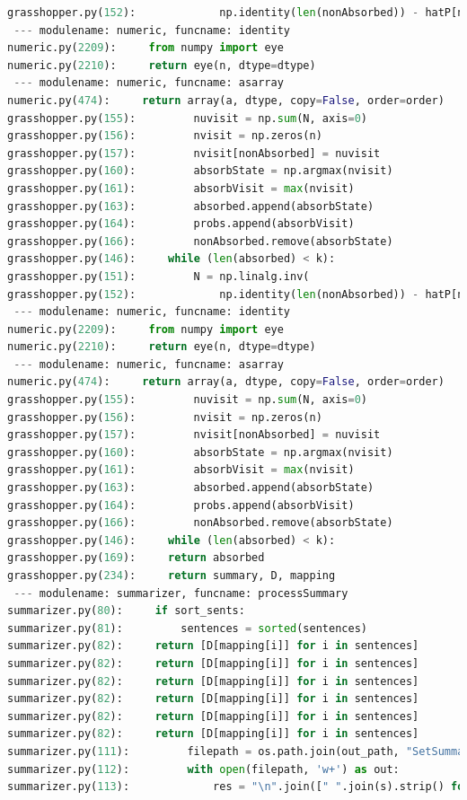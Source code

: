 \documentclass[10pt]{article}
\begin{document}
\begin{lstlisting}[breaklines,language=Python]
grasshopper.py(152):             np.identity(len(nonAbsorbed)) - hatP[nonAbsorbed, nonAbsorbed])
 --- modulename: numeric, funcname: identity
numeric.py(2209):     from numpy import eye
numeric.py(2210):     return eye(n, dtype=dtype)
 --- modulename: numeric, funcname: asarray
numeric.py(474):     return array(a, dtype, copy=False, order=order)
grasshopper.py(155):         nuvisit = np.sum(N, axis=0)
grasshopper.py(156):         nvisit = np.zeros(n)
grasshopper.py(157):         nvisit[nonAbsorbed] = nuvisit
grasshopper.py(160):         absorbState = np.argmax(nvisit)
grasshopper.py(161):         absorbVisit = max(nvisit)
grasshopper.py(163):         absorbed.append(absorbState)
grasshopper.py(164):         probs.append(absorbVisit)
grasshopper.py(166):         nonAbsorbed.remove(absorbState)
grasshopper.py(146):     while (len(absorbed) < k):
grasshopper.py(151):         N = np.linalg.inv(
grasshopper.py(152):             np.identity(len(nonAbsorbed)) - hatP[nonAbsorbed, nonAbsorbed])
 --- modulename: numeric, funcname: identity
numeric.py(2209):     from numpy import eye
numeric.py(2210):     return eye(n, dtype=dtype)
 --- modulename: numeric, funcname: asarray
numeric.py(474):     return array(a, dtype, copy=False, order=order)
grasshopper.py(155):         nuvisit = np.sum(N, axis=0)
grasshopper.py(156):         nvisit = np.zeros(n)
grasshopper.py(157):         nvisit[nonAbsorbed] = nuvisit
grasshopper.py(160):         absorbState = np.argmax(nvisit)
grasshopper.py(161):         absorbVisit = max(nvisit)
grasshopper.py(163):         absorbed.append(absorbState)
grasshopper.py(164):         probs.append(absorbVisit)
grasshopper.py(166):         nonAbsorbed.remove(absorbState)
grasshopper.py(146):     while (len(absorbed) < k):
grasshopper.py(169):     return absorbed
grasshopper.py(234):     return summary, D, mapping
 --- modulename: summarizer, funcname: processSummary
summarizer.py(80):     if sort_sents:
summarizer.py(81):         sentences = sorted(sentences)
summarizer.py(82):     return [D[mapping[i]] for i in sentences]
summarizer.py(82):     return [D[mapping[i]] for i in sentences]
summarizer.py(82):     return [D[mapping[i]] for i in sentences]
summarizer.py(82):     return [D[mapping[i]] for i in sentences]
summarizer.py(82):     return [D[mapping[i]] for i in sentences]
summarizer.py(82):     return [D[mapping[i]] for i in sentences]
summarizer.py(111):         filepath = os.path.join(out_path, "SetSummary.{}.txt".format(setID))
summarizer.py(112):         with open(filepath, 'w+') as out:
summarizer.py(113):             res = "\n".join([" ".join(s).strip() for s in summary])

\end{lstlisting}
\end{document}
